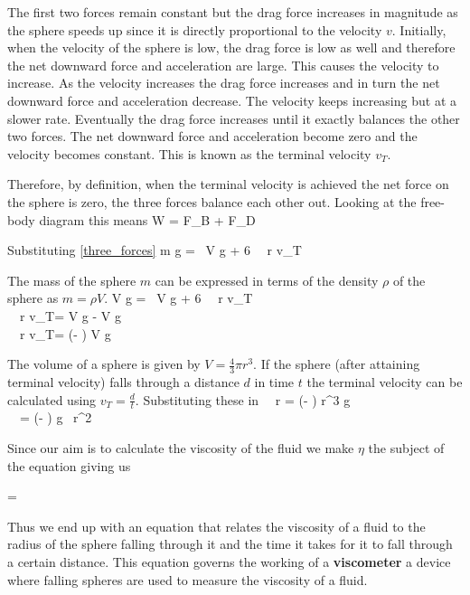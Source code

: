    The first two forces remain constant but the drag force increases in magnitude as the sphere speeds up since it is directly proportional to the velocity $v$. Initially, when the velocity of the sphere is low, the drag force is low as well and therefore the net downward force and acceleration are large. This causes the velocity to increase. As the velocity increases the drag force increases and in turn the net downward force and acceleration decrease. The velocity keeps increasing but at a slower rate. Eventually the drag force increases until it exactly balances the other two forces. The net downward force and acceleration become zero and the velocity becomes constant. This is known as the terminal velocity $v_T$.

   Therefore, by definition, when the terminal velocity is achieved the net force on the sphere is zero, the three forces balance each other out. Looking at the free-body diagram this means
   \beq
      W = F_B + F_D
   \eeq
   \def\stokes{6 \pi \, \eta \, r v_T}

   Substituting \eqref{three_forces}
   \beqn
      \imply m g = \sigma \, V g + \stokes 
   \eeqn

   The mass of the sphere $m$ can be expressed in terms of the density $\rho$ of the sphere as $m = \rho V$.
   \beqcn
      \imply \rho V g = \sigma \, V g + \stokes\\
      \imply \stokes = \rho V g - \sigma V g\\
      \imply \stokes = (\rho - \sigma) V g
   \eeqcn

   The volume of a sphere is given by $V = \frac{4}{3} \pi r^3$. If the sphere (after attaining terminal velocity) falls through a distance $d$ in time $t$ the terminal velocity can be calculated using $v_T = \frac{d}{t}$. Substituting these in
   \beqcn
       \pi \, \eta \, r  = (\rho - \sigma)  \pi r^3 g\\
       \, \eta \,  =  (\rho - \sigma) g \, r^2\\
   \eeqcn

   Since our aim is to calculate the viscosity of the fluid we make $\eta$ the subject of the equation giving us

   \beq
      \eta =  
   \eeq

   Thus we end up with an equation that relates the viscosity of a fluid to the radius of the sphere falling through it and the time it takes for it to fall through a certain distance. This equation governs the working of a \textbf{viscometer} a device where falling spheres are used to measure the viscosity of a fluid.
